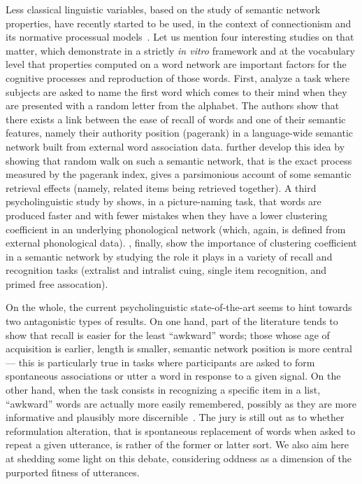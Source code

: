 Less classical linguistic variables, based on the study of semantic network properties, have recently started to be used, in the context of connectionism and its normative processual models~\citep[see for instance][]{collins1975spreading}.
Let us mention four interesting studies on that matter, which demonstrate in a strictly \emph{in vitro} framework and at the vocabulary level that properties computed on a word network are important factors for the cognitive processes and reproduction of those words.
First, \citet{Griffiths07} analyze a task where subjects are asked to name the first word which comes to their mind when they are presented with a random letter from the %
alphabet. The authors show that there exists a link between the ease of recall of words and one of their semantic features, namely their authority position (pagerank) in a language-wide semantic network built from external word association data.
\citet{austerweil2012human} further develop this idea by showing that random walk on such a semantic network, that is the exact process measured by the pagerank index, gives a parsimonious account of some semantic retrieval effects (namely, related items being retrieved together).
A third psycholinguistic study by \citet{Chan10} shows, in a picture-naming task, that words are produced faster and with fewer mistakes when they have a lower clustering coefficient in an underlying phonological network (which, again, is  defined from external phonological data).
\citet{nelson2013activation}, finally, show the importance of clustering coefficient in a semantic network by studying the role it plays in a variety of recall and recognition tasks (extralist and intralist cuing, single item recognition, and primed free assocation).

On the whole, the current psycholinguistic state-of-the-art seems to hint towards two antagonistic types of results.
On one hand, part of the literature tends to show that recall is easier for the least ``awkward'' words; those whose age of acquisition is earlier, length is smaller, semantic network position is more central --- this is particularly true in tasks where participants are asked to form spontaneous associations or utter a word in response to a given signal.
On the other hand, when the task consists in recognizing a specific item in a list, ``awkward'' words are actually more easily remembered, possibly as they are more informative and plausibly more discernible~\citep[see again][for a review]{Yonelinas02}.
The jury is still out as to whether reformulation alteration, that is spontaneous replacement of words when asked to repeat a given utterance, is rather of the former or latter sort.
We also aim here at shedding some light on this debate, considering oddness as a dimension of the purported fitness of utterances.

